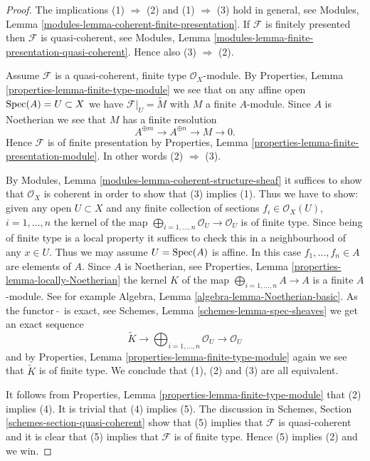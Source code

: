 \begin{proof}
The implications (1) $\Rightarrow$ (2) and (1) $\Rightarrow$ (3) hold
in general, see
Modules, Lemma \ref{modules-lemma-coherent-finite-presentation}.
If $\mathcal{F}$ is finitely presented then $\mathcal{F}$ is
quasi-coherent, see
Modules, Lemma \ref{modules-lemma-finite-presentation-quasi-coherent}.
Hence also (3) $\Rightarrow$ (2).

\medskip\noindent
Assume $\mathcal{F}$ is a quasi-coherent, finite type $\mathcal{O}_X$-module.
By
Properties, Lemma \ref{properties-lemma-finite-type-module}
we see that on any affine open
$\mathop{\mathrm{Spec}}(A) = U \subset X$ we have $\mathcal{F}|_U = \widetilde M$
with $M$ a finite $A$-module. Since $A$ is Noetherian we see that
$M$ has a finite resolution
$$
A^{\oplus m} \to A^{\oplus n} \to M \to 0.
$$
Hence $\mathcal{F}$ is of finite presentation by
Properties, Lemma \ref{properties-lemma-finite-presentation-module}.
In other words (2) $\Rightarrow$ (3).

\medskip\noindent
By Modules, Lemma \ref{modules-lemma-coherent-structure-sheaf} it suffices
to show that $\mathcal{O}_X$ is coherent in order to show that (3)
implies (1). Thus we have to show: given any open $U \subset X$ and
any finite collection of sections $f_i \in \mathcal{O}_X(U)$,
$i = 1, \ldots, n$ the kernel of the map
$\bigoplus_{i = 1, \ldots, n} \mathcal{O}_U \to \mathcal{O}_U$
is of finite type. Since being of finite type is a local property
it suffices to check this in a neighbourhood of any $x \in U$.
Thus we may assume $U = \mathop{\mathrm{Spec}}(A)$ is affine. In this case
$f_1, \ldots, f_n \in A$ are elements of $A$. Since $A$ is
Noetherian, see
Properties, Lemma \ref{properties-lemma-locally-Noetherian}
the kernel $K$ of the map $\bigoplus_{i = 1, \ldots, n} A \to A$
is a finite $A$-module. See for example
Algebra, Lemma \ref{algebra-lemma-Noetherian-basic}.
As the functor\ $\widetilde{ }$\ is exact, see
Schemes, Lemma \ref{schemes-lemma-spec-sheaves}
we get an exact sequence
$$
\widetilde K \to
\bigoplus\nolimits_{i = 1, \ldots, n} \mathcal{O}_U \to
\mathcal{O}_U
$$
and by
Properties, Lemma \ref{properties-lemma-finite-type-module}
again we see that $\widetilde K$ is of finite type. We conclude
that (1), (2) and (3) are all equivalent.

\medskip\noindent
It follows from
Properties, Lemma \ref{properties-lemma-finite-type-module}
that (2) implies (4). It is trivial that (4) implies (5).
The discussion in
Schemes, Section \ref{schemes-section-quasi-coherent}
show that (5) implies
that $\mathcal{F}$ is quasi-coherent and it is clear that (5)
implies that $\mathcal{F}$ is of finite type. Hence (5) implies
(2) and we win.
\end{proof}

